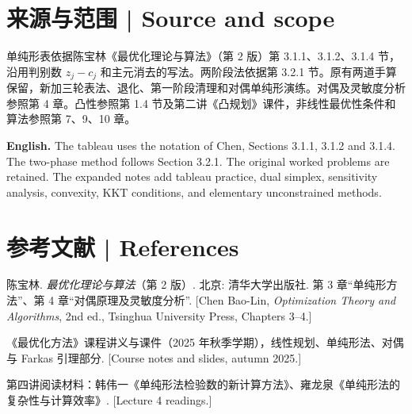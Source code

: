 \documentclass[UTF8,11pt,a4paper]{ctexart}
\newcommand{\EN}[1]{\par\noindent \textbf{English.} #1\par}
\begin{document}
\section*{来源与范围 | Source and scope}
单纯形表依据陈宝林《最优化理论与算法》（第 2 版）第 3.1.1、3.1.2、3.1.4 节，沿用判别数 $z_j-c_j$ 和主元消去的写法。两阶段法依据第 3.2.1 节。原有两道手算保留，新加三轮表法、退化、第一阶段清理和对偶单纯形演练。对偶及灵敏度分析参照第 4 章。凸性参照第 1.4 节及第二讲《凸规划》课件，非线性最优性条件和算法参照第 7、9、10 章。
\EN{The tableau uses the notation of Chen, Sections 3.1.1, 3.1.2 and 3.1.4. The two-phase method follows Section 3.2.1. The original worked problems are retained. The expanded notes add tableau practice, dual simplex, sensitivity analysis, convexity, KKT conditions, and elementary unconstrained methods.}
\section*{参考文献 | References}
\begin{enumerate}[label={[\arabic*]},leftmargin=2.4em]
\item 陈宝林. \textit{最优化理论与算法}（第 2 版）. 北京: 清华大学出版社. 第 3 章“单纯形方法”、第 4 章“对偶原理及灵敏度分析”. [Chen Bao-Lin, \textit{Optimization Theory and Algorithms}, 2nd ed., Tsinghua University Press, Chapters 3--4.]
\item 《最优化方法》课程讲义与课件（2025 年秋季学期），线性规划、单纯形法、对偶与 Farkas 引理部分. [Course notes and slides, autumn 2025.]
\item 第四讲阅读材料：韩伟一《单纯形法检验数的新计算方法》、雍龙泉《单纯形法的复杂性与计算效率》. [Lecture 4 readings.]
\end{enumerate}
\end{document}
